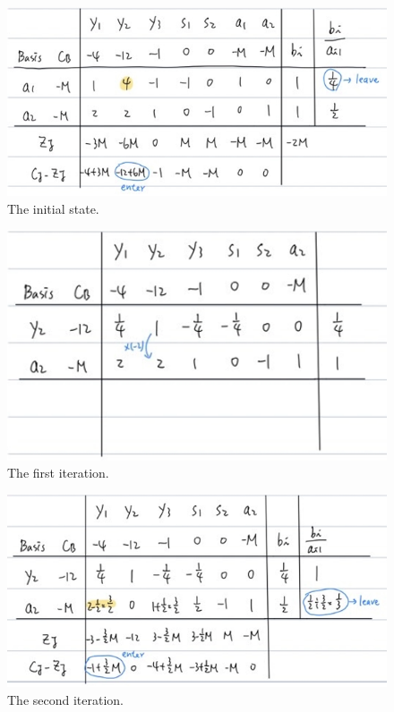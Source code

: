\documentclass[a4paper,10pt]{article}
\begin{document}
\begin{enumerate}
\begin{enumerate}
{\begin{enumerate}
                \begin{figure}[H]
                    \centering
                    \includegraphics[scale=0.6]{./iter1.png}
                    \caption{The initial state.}
                \end{figure}

                \begin{figure}[H]
                    \centering
                    \includegraphics[scale=0.6]{./iter2.png}
                    \caption{The first iteration.}
                \end{figure}

                \begin{figure}[H]
                    \centering
                    \includegraphics[scale=0.6]{./iter3.png}
                    \caption{The second iteration.}
                \end{figure}


\end{enumerate}}
\end{enumerate}
\end{enumerate}
\end{document}

